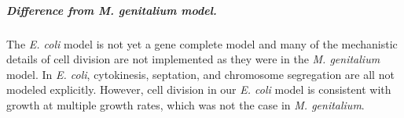 \documentclass[12pt]{article}
\begin{document}
\subparagraph{Difference from \emph{M. genitalium} model.} The \emph{E. coli} model is not yet a gene complete model and many of the mechanistic details of cell division are not implemented as they were in the \emph{M. genitalium} model. In \emph{E. coli}, cytokinesis, septation, and chromosome segregation are all not modeled explicitly. However, cell division in our \textit{E. coli} model is consistent with growth at multiple growth rates, which was not the case in \textit{M. genitalium}.

\newpage

\label{sec:references}


\end{document}
